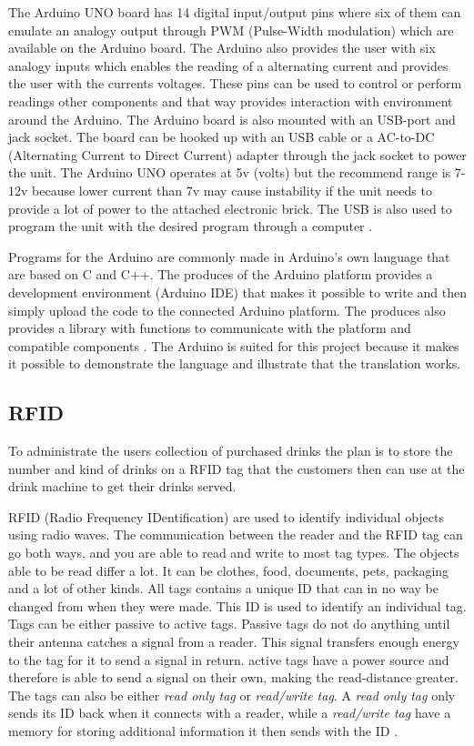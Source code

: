 The Arduino UNO board has 14 digital input/output pins where six of them can emulate an analogy output through PWM (Pulse-Width modulation) which are available on the Arduino board. The Arduino also provides the user with six analogy inputs which enables the reading of a alternating current and provides the user with the currents voltages. These pins can be used to control or perform readings other components and that way provides interaction with environment around the Arduino.
The Arduino board is also mounted with an USB-port and jack socket. The board can be hooked up with an USB cable or a AC-to-DC (Alternating Current to Direct Current) adapter through the jack socket to power the unit. The Arduino UNO operates at 5v (volts) but the recommend range is 7-12v because lower current than 7v may cause instability if the unit needs to provide a lot of power to the attached electronic brick. The USB is also used to program the unit with the desired program through a computer \citep{ArduinoUno}.

Programs for the Arduino are commonly made in Arduino's own language that are based on C and C++. The produces of the Arduino platform provides a development environment (Arduino IDE) that makes it possible to write and then simply upload the code to the connected Arduino platform. The produces also provides a library with functions to communicate with the platform and compatible components \citep{ArduinoLanguage}.
The Arduino is suited for this project because it makes it possible to demonstrate the language and illustrate that the translation works.
\label{sec:hardwarearduino}

\subsection{RFID}
To administrate the users collection of purchased drinks the plan is to store the number and kind of drinks on a RFID tag that the customers then can use at the drink machine to get their drinks served.

RFID (Radio Frequency IDentification) are used to identify individual objects using radio waves.
The communication between the reader and the RFID tag can go both ways, and you are able to read and write to most tag types. 
The objects able to be read differ a lot. It can be clothes, food, documents, pets, packaging and a lot of other kinds. 
All tags contains a unique ID that can in no way be changed from when they were made. This ID is used to identify an individual tag.
Tags can be either passive to active tags. Passive tags do not do anything until their antenna catches a signal from a reader. This signal transfers enough energy to the tag for it to send a signal in return. active tags have a power source and therefore is able to send a signal on their own, making the read-distance greater.
The tags can also be either \textit{read only tag} or \textit{read/write tag}. A \textit{read only tag} only sends its ID back when it connects with a reader, while a \textit{read/write tag} have a memory for storing additional information it then sends with the ID \citep{RFID}.

